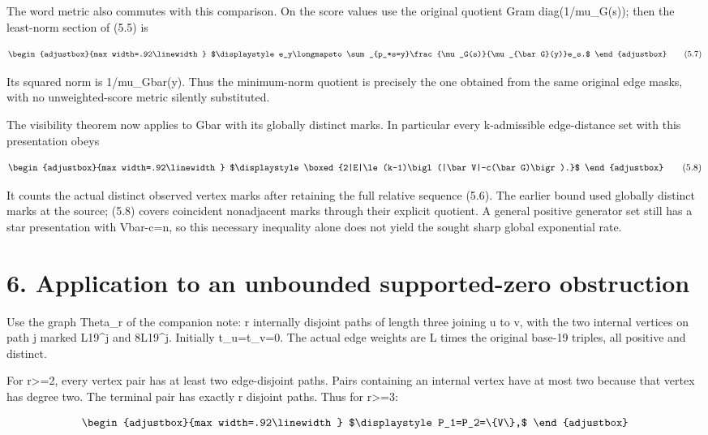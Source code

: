 The word metric also commutes with this comparison. On the score values use the original quotient Gram diag(1/mu\_G(s)); then the least-norm section of (5.5) is

\[
\begin{adjustbox}{max width=.92\linewidth}
$\displaystyle e_y\longmapsto\sum_{p_*s=y}\frac{\mu_G(s)}{\mu_{\bar G}(y)}e_s.$
\end{adjustbox}
\tag{5.7}
\]

Its squared norm is 1/mu\_Gbar(y). Thus the minimum-norm quotient is precisely the one obtained from the same original edge masks, with no unweighted-score metric silently substituted.

The visibility theorem now applies to Gbar with its globally distinct marks. In particular every k-admissible edge-distance set with this presentation obeys

\[
\begin{adjustbox}{max width=.92\linewidth}
$\displaystyle \boxed{2|E|\le(k-1)\bigl(|\bar V|-c(\bar G)\bigr).}$
\end{adjustbox}
\tag{5.8}
\]

It counts the actual distinct observed vertex marks after retaining the full relative sequence (5.6). The earlier bound used globally distinct marks at the source; (5.8) covers coincident nonadjacent marks through their explicit quotient. A general positive generator set still has a star presentation with \textbar Vbar\textbar-c=n, so this necessary inequality alone does not yield the sought sharp global exponential rate.

\section{6. Application to an unbounded supported-zero obstruction}\label{n11-application-to-an-unbounded-supported-zero-obstruction}

Use the graph Theta\_r of the companion note: r internally disjoint paths of length three joining u to v, with the two internal vertices on path j marked L19\^{}j and 8L19\^{}j. Initially t\_u=t\_v=0. The actual edge weights are L times the original base-19 triples, all positive and distinct.

For r\textgreater=2, every vertex pair has at least two edge-disjoint paths. Pairs containing an internal vertex have at most two because that vertex has degree two. The terminal pair has exactly r disjoint paths. Thus for r\textgreater=3:

\[
\begin{adjustbox}{max width=.92\linewidth}
$\displaystyle P_1=P_2=\{V\},$
\end{adjustbox}
\]


